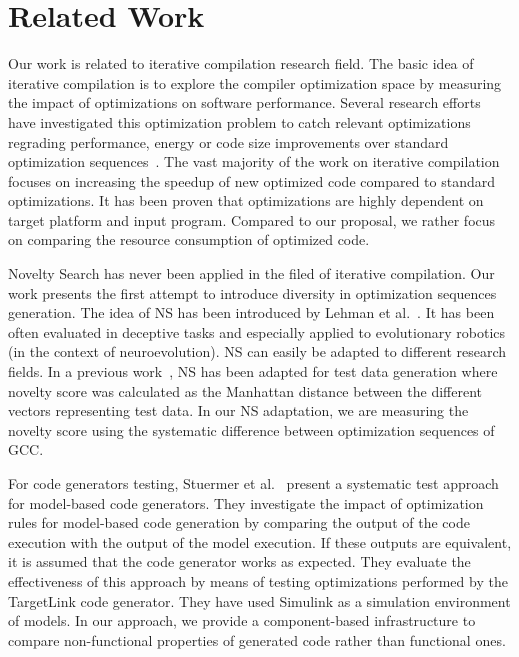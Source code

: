 \section{Related Work}
Our work is related to iterative compilation research field.
The basic idea of iterative compilation is to explore the compiler optimization space by measuring the impact of optimizations on software performance.
Several research efforts have investigated this optimization problem to catch relevant optimizations regrading performance, energy or code size improvements over standard optimization sequences~\cite{almagor2004finding,hoste2008cole,pan2006fast,zhong2009tuning,pallister2015identifying,chen2012deconstructing,sandran2012genetic,martins2014exploration,fursin2008milepost,lin2008automatic,schulte2014post,martinez2014multi,hoste2008cole}. 
The vast majority of the work on iterative compilation focuses on increasing the speedup of new optimized code compared to standard optimizations. 
It has been proven that optimizations are highly dependent on target platform and input program. Compared to our proposal, we rather focus on comparing the resource consumption of optimized code.

Novelty Search has never been applied in the filed of iterative compilation. Our work presents the first attempt to introduce diversity in optimization sequences generation. The idea of NS has been introduced by Lehman et al.~\cite{lehman2008exploiting}. It has been often evaluated in deceptive tasks and especially applied to evolutionary robotics~\cite{risi2010evolving,krvcah2012solving} (in the context of neuroevolution). 
NS can easily be adapted to different research fields. In a previous work~\cite{boussaa2015novelty}, NS has been adapted for test data generation where novelty score was calculated as the Manhattan distance between the different vectors representing test data.
In our NS adaptation, we are measuring the novelty score using the systematic difference between optimization sequences of GCC.

For code generators testing, Stuermer et al.~\cite{stuermer2007systematic} present a systematic test approach for model-based code generators. They investigate the impact of optimization rules for model-based code generation by comparing the output of the code execution with the output of the model execution. 
If these outputs are equivalent, it is assumed that the code generator works as expected. 
They evaluate the effectiveness of this approach by means of testing optimizations performed by the TargetLink code generator. 
They have used Simulink as a simulation environment of models. 
In our approach, we provide a component-based infrastructure to compare non-functional properties of generated code rather than functional ones. 

